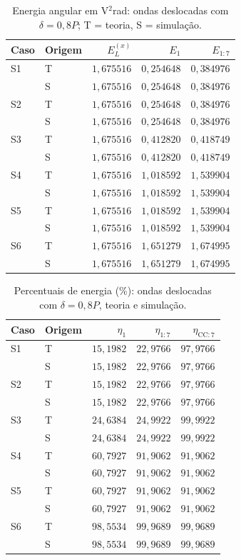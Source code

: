 \begin{table}[H]
\centering
\footnotesize\setlength{\tabcolsep}{3.5pt}
\caption{Energia angular em V$^2$rad: ondas deslocadas com $\delta=0{,}8P$; T = teoria, S = simulação.}\label{tab:energia_abs3}
\begin{tabular}{llrrr}\hline
Caso & Origem & $E_L^{(x)}$ & $E_1$ & $E_{1:7}$ \\ \hline
S1 & T & $1{,}675516$ & $0{,}254648$ & $0{,}384976$ \\
 & S & $1{,}675516$ & $0{,}254648$ & $0{,}384976$ \\
S2 & T & $1{,}675516$ & $0{,}254648$ & $0{,}384976$ \\
 & S & $1{,}675516$ & $0{,}254648$ & $0{,}384976$ \\
S3 & T & $1{,}675516$ & $0{,}412820$ & $0{,}418749$ \\
 & S & $1{,}675516$ & $0{,}412820$ & $0{,}418749$ \\
S4 & T & $1{,}675516$ & $1{,}018592$ & $1{,}539904$ \\
 & S & $1{,}675516$ & $1{,}018592$ & $1{,}539904$ \\
S5 & T & $1{,}675516$ & $1{,}018592$ & $1{,}539904$ \\
 & S & $1{,}675516$ & $1{,}018592$ & $1{,}539904$ \\
S6 & T & $1{,}675516$ & $1{,}651279$ & $1{,}674995$ \\
 & S & $1{,}675516$ & $1{,}651279$ & $1{,}674995$ \\
\hline\end{tabular}
\end{table}
\begin{table}[H]
\centering
\footnotesize\setlength{\tabcolsep}{3.5pt}
\caption{Percentuais de energia (\%): ondas deslocadas com $\delta=0{,}8P$, teoria e simulação.}\label{tab:energias_08P}
\begin{tabular}{llrrr}\hline
Caso & Origem & $\eta_1$ & $\eta_{1:7}$ & $\eta_{\mathrm{CC}:7}$ \\ \hline
S1 & T & $15{,}1982$ & $22{,}9766$ & $97{,}9766$ \\
 & S & $15{,}1982$ & $22{,}9766$ & $97{,}9766$ \\
S2 & T & $15{,}1982$ & $22{,}9766$ & $97{,}9766$ \\
 & S & $15{,}1982$ & $22{,}9766$ & $97{,}9766$ \\
S3 & T & $24{,}6384$ & $24{,}9922$ & $99{,}9922$ \\
 & S & $24{,}6384$ & $24{,}9922$ & $99{,}9922$ \\
S4 & T & $60{,}7927$ & $91{,}9062$ & $91{,}9062$ \\
 & S & $60{,}7927$ & $91{,}9062$ & $91{,}9062$ \\
S5 & T & $60{,}7927$ & $91{,}9062$ & $91{,}9062$ \\
 & S & $60{,}7927$ & $91{,}9062$ & $91{,}9062$ \\
S6 & T & $98{,}5534$ & $99{,}9689$ & $99{,}9689$ \\
 & S & $98{,}5534$ & $99{,}9689$ & $99{,}9689$ \\
\hline\end{tabular}
\end{table}
